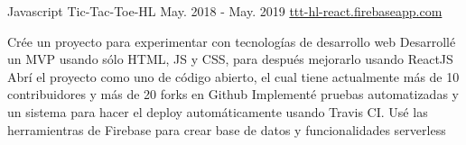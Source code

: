 \begin{cventries}

  \cventry
    {Javascript}
    {Tic-Tac-Toe-HL} %
    {May. 2018 - May. 2019} %
    {\url{ttt-hl-react.firebaseapp.com}} %
    {
      \begin{cvitems} %
         {{
          Crée un proyecto para experimentar con tecnologías de desarrollo web
        }}
         {{
          Desarrollé un MVP usando sólo HTML, JS y CSS, para después mejorarlo usando ReactJS
        }}
         {{
          Abrí el proyecto como uno de código abierto, el cual tiene actualmente más de 10 contribuidores y más de 20 forks en Github
        }}
         {{
          Implementé pruebas automatizadas y un sistema para hacer el deploy automáticamente usando Travis CI.
        }}
         {{
          Usé las herramientras de Firebase para crear base de datos y funcionalidades serverless
        }}
      \end{cvitems}
    }



\end{cventries}
